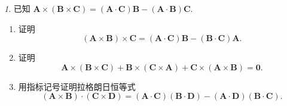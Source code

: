 \documentclass[11pt]{article}
\theoremstyle{remark}
\newtheorem{problem}{}
\theoremstyle{definition}
\begin{document}
\begin{problem}
  已知
  $\mathbf{A}\times(\mathbf{B}\times\mathbf{C})
  =(\mathbf{A}\cdot\mathbf{C})\mathbf{B}-(\mathbf{A}\cdot\mathbf{B})\mathbf{C}$.
  \begin{enumerate}
    \item 证明
      \[
        (\mathbf{A}\times\mathbf{B})\times\mathbf{C}
        =(\mathbf{A}\cdot\mathbf{C})\mathbf{B}
         -(\mathbf{B}\cdot\mathbf{C})\mathbf{A}.
      \]
    \item 证明
      \[
        \mathbf{A}\times(\mathbf{B}\times\mathbf{C})
        +\mathbf{B}\times(\mathbf{C}\times\mathbf{A})
        +\mathbf{C}\times(\mathbf{A}\times\mathbf{B})
        =\mathbf{0}.
      \]
    \item 用指标记号证明拉格朗日恒等式
      \[
        (\mathbf{A}\times\mathbf{B})\cdot(\mathbf{C}\times\mathbf{D})
        =(\mathbf{A}\cdot\mathbf{C})(\mathbf{B}\cdot\mathbf{D})
         -(\mathbf{A}\cdot\mathbf{D})(\mathbf{B}\cdot\mathbf{C}).
      \]
  \end{enumerate}
\end{problem}
\end{document}
